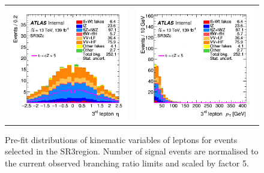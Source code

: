 \begin{figure}[!htbp]
\begin{tabular}{cc}
		\includegraphics[width=.45\textwidth]{Chapters/CH5/figures/SR3_UsingSMT/lep3_eta} &
		\includegraphics[width=.45\textwidth]{Chapters/CH5/figures/SR3_UsingSMT/lep3_pt} \\
	\end{tabular}
	\caption{Pre-fit distributions of kinematic variables of leptons for events selected in the SR3\tZc region.  Number of signal events are normalised to the current observed branching ratio limits and scaled by factor 5. 
		\ErrStatOnly
		\Blinded
	}%
	\label{fig:sr3_kin_lep}
\end{figure}

